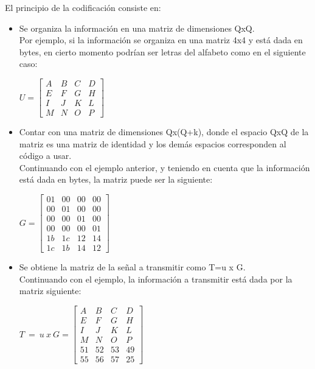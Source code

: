 El principio de la codificación consiste en:
 \begin{itemize}
 \item Se organiza la información en una matriz de dimensiones QxQ. \\
 
 Por ejemplo, si la información se organiza en una matriz 4x4 y está dada en bytes, en cierto momento podrían ser letras del alfabeto como en el siguiente caso:
 
$ U= \begin{bmatrix}
    A & B & C & D \\
    E & F & G & H \\
    I & J & K & L \\
    M & N & O & P
\end{bmatrix}$
 \item Contar con una matriz de dimensiones Qx(Q+k), donde el espacio QxQ de la matriz es una matriz de identidad y los demás espacios corresponden al código a usar.  \\
 
 Continuando con el ejemplo anterior, y teniendo en cuenta que la información está dada en bytes, la matriz puede ser la siguiente:
 
 $ G= \begin{bmatrix}
    01 & 00 & 00 & 00 \\
    00 & 01 & 00 & 00 \\
    00 & 00 & 01 & 00 \\
    00 & 00 & 00 & 01 \\
    1b & 1c & 12 & 14 \\
    1c & 1b & 14 & 12 
\end{bmatrix}$

 \item Se obtiene la matriz de la señal a transmitir como T=u x G.\\
 
 Continuando con el ejemplo, la información a transmitir está dada por la matriz siguiente:
 
  $ T \ = \ u \ x \ G = \begin{bmatrix}
    A & B & C & D \\
    E & F & G & H \\
    I & J & K & L \\
    M & N & O & P \\
    51 & 52 & 53 & 49 \\
    55 & 56 & 57 & 25 
\end{bmatrix}$


\end{itemize}
